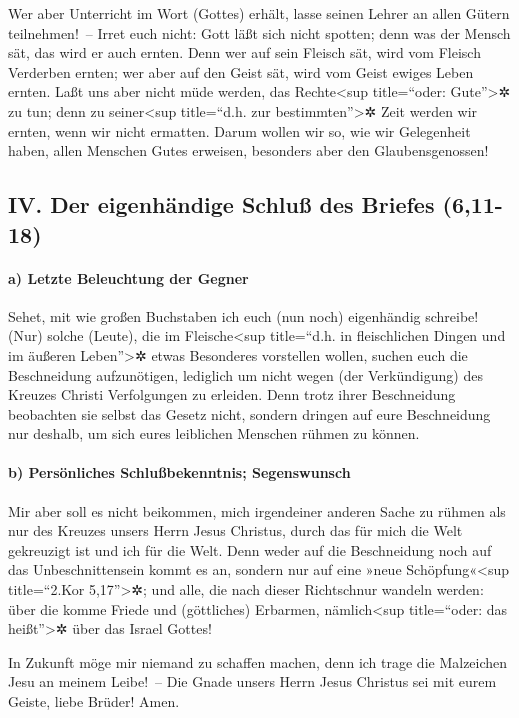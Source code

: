  Wer aber Unterricht im Wort (Gottes) erhält, lasse seinen
Lehrer an allen Gütern teilnehmen!~--  Irret euch nicht:
Gott läßt sich nicht spotten; denn was der Mensch sät, das wird er auch
ernten.  Denn wer auf sein Fleisch sät, wird vom Fleisch
Verderben ernten; wer aber auf den Geist sät, wird vom Geist ewiges
Leben ernten.  Laßt uns aber nicht müde werden, das
Rechte\textless sup title=``oder: Gute''\textgreater✲ zu tun; denn zu
seiner\textless sup title=``d.h. zur bestimmten''\textgreater✲ Zeit
werden wir ernten, wenn wir nicht ermatten.  Darum wollen
wir so, wie wir Gelegenheit haben, allen Menschen Gutes erweisen,
besonders aber den Glaubensgenossen!

\hypertarget{iv.-der-eigenhuxe4ndige-schluuxdf-des-briefes-611-18}{%
\subsection{IV. Der eigenhändige Schluß des Briefes
(6,11-18)}\label{iv.-der-eigenhuxe4ndige-schluuxdf-des-briefes-611-18}}

\hypertarget{a-letzte-beleuchtung-der-gegner}{%
\paragraph{a) Letzte Beleuchtung der
Gegner}\label{a-letzte-beleuchtung-der-gegner}}

 Sehet, mit wie großen Buchstaben ich euch (nun noch)
eigenhändig schreibe!  (Nur) solche (Leute), die im
Fleische\textless sup title=``d.h. in fleischlichen Dingen und im
äußeren Leben''\textgreater✲ etwas Besonderes vorstellen wollen, suchen
euch die Beschneidung aufzunötigen, lediglich um nicht wegen (der
Verkündigung) des Kreuzes Christi Verfolgungen zu erleiden.
 Denn trotz ihrer Beschneidung beobachten sie selbst das
Gesetz nicht, sondern dringen auf eure Beschneidung nur deshalb, um sich
eures leiblichen Menschen rühmen zu können.

\hypertarget{b-persuxf6nliches-schluuxdfbekenntnis-segenswunsch}{%
\paragraph{b) Persönliches Schlußbekenntnis;
Segenswunsch}\label{b-persuxf6nliches-schluuxdfbekenntnis-segenswunsch}}

 Mir aber soll es nicht beikommen, mich irgendeiner
anderen Sache zu rühmen als nur des Kreuzes unsers Herrn Jesus Christus,
durch das für mich die Welt gekreuzigt ist und ich für die Welt.
 Denn weder auf die Beschneidung noch auf das
Unbeschnittensein kommt es an, sondern nur auf eine »neue
Schöpfung«\textless sup title=``2.Kor 5,17''\textgreater✲;
 und alle, die nach dieser Richtschnur wandeln werden:
über die komme Friede und (göttliches) Erbarmen, nämlich\textless sup
title=``oder: das heißt''\textgreater✲ über das Israel Gottes!

 In Zukunft möge mir niemand zu schaffen machen, denn ich
trage die Malzeichen Jesu an meinem Leibe!~--  Die Gnade
unsers Herrn Jesus Christus sei mit eurem Geiste, liebe Brüder! Amen.
